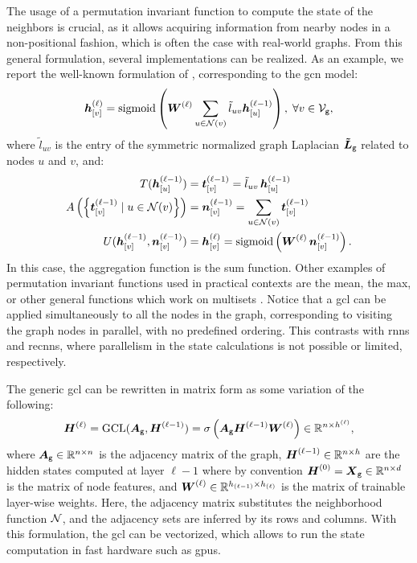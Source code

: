 The usage of a permutation invariant function to compute the state of the neighbors is crucial, as it allows acquiring information from nearby nodes in a non-positional fashion, which is often the case with real-world graphs. From this general formulation, several implementations can be realized. As an example, we report the well-known formulation of \citet{kipf2017semisupervisedgcn}, corresponding to the \gls{gcn} model:
\begin{align}
    \label{eq:convolutional}
    \StateVector{v}{\ell} = \sigmoid\Par{ \LayerMatrix{w}{\ell} \sum_{u \in \Neigh(v)} \tilde{l}_{uv}\StateVector{u}{\ell-1}}, \; \forall v \in \Nodes{g},
\end{align}
where $\tilde{l}_{uv}$ is the entry of the symmetric normalized graph Laplacian $\NormLaplacianMatrix{g}$ related to nodes $u$ and $v$, and:
\begin{align}
    \label{eq:transform}
    T(\StateVector{u}{\ell-1}) &= \GenStateVector{t}{v}{\ell-1}  = \tilde{l}_{uv}\,\StateVector{u}{\ell-1}\\
    \label{eq:aggregate}
    A\Par{\Set{\GenStateVector{t}{v}{\ell-1} \mid u \in \Neigh(v)}} &= \GenStateVector{n}{v}{\ell-1} = \sum_{u \in \Neigh(v)} \GenStateVector{t}{v}{\ell-1}\\
    \label{eq:update}
    U(\StateVector{v}{\ell-1}, \GenStateVector{n}{v}{\ell-1}) &= \StateVector{v}{\ell} =  \sigmoid\Par{\LayerMatrix{w}{\ell}\, \GenStateVector{n}{v}{\ell-1}}.
\end{align}
In this case, the aggregation function is the sum function. Other examples of permutation invariant functions used in practical contexts are the mean, the max, or other general functions which work on multisets \citep{zaheer2017deepsets}. Notice that a \gls{gcl} can be applied simultaneously to all the nodes in the graph, corresponding to visiting the graph nodes in parallel, with no predefined ordering. This contrasts with \glspl{rnn} and \glspl{recnn}, where parallelism in the state calculations is not possible or limited, respectively.

The generic \gls{gcl} can be rewritten in matrix form as some variation of the following:
$$\LayerStateMat{\ell} = \Fun{GCL}(\AdjMatrix{g}, \LayerStateMat{\ell-1}) =   \sigma\Par{\AdjMatrix{g}\LayerStateMat{\ell-1}\LayerMatrix{w}{\ell}} \in \Real^{n \times h^{(\ell)}},$$
where $\AdjMatrix{g} \in \Real^{n \times n}$ is the adjacency matrix of the graph, $\LayerStateMat{\ell-1} \in \Real^{n \times h}$ are the hidden states computed at layer $\ell-1$ where by convention $\LayerStateMat{0} = \FeatureMatrix{g} \in \Real^{n \times d}$ is the matrix of node features, and $\LayerMatrix{w}{\ell} \in \Real^{h_{(\ell-1)} \times h_{(\ell)}}$ is the matrix of trainable layer-wise weights. Here, the adjacency matrix substitutes the neighborhood function $\Neigh$, and the adjacency sets are inferred by its rows and columns. With this formulation, the \gls{gcl} can be vectorized, which allows to run the state computation in fast hardware such as \glspl{gpu}.

